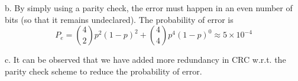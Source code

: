 \documentclass[10pt,letterpaper]{article}
\begin{document}
b. By simply using a parity check, the error must happen in an even number of bits (so that it remains undeclared). The probability of error is
$$
P_e=\binom{4}{2}p^2(1-p)^2+\binom{4}{4}p^4(1-p)^0\approx 5\times 10^{-4}
$$

c. It can be observed that we have added more redundancy in CRC w.r.t. the parity check scheme to reduce the probability of error.
\end{document}
